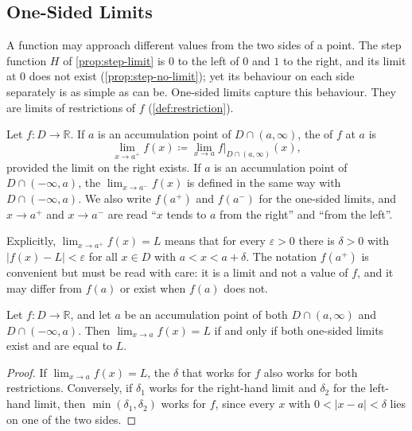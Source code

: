\subsection{One-Sided Limits}

A function may approach different values from the two sides of a point. The step function $H$ of \cref{prop:step-limit} is $0$ to the left of $0$ and $1$ to the right, and its limit at $0$ does not exist (\cref{prop:step-no-limit}); yet its behaviour on each side separately is as simple as can be. One-sided limits capture this behaviour. They are limits of restrictions of $f$ (\cref{def:restriction}).

\begin{definition}
\label{def:one-sided}
Let $f\colon D\to\mathbb R$. If $a$ is an accumulation point of $D\cap(a,\infty)$, the  of $f$ at $a$ is
\[
\lim_{x\to a^+}f(x)\coloneqq\lim_{x\to a}f|_{D\cap(a,\infty)}(x),
\]
provided the limit on the right exists. If $a$ is an accumulation point of $D\cap(-\infty,a)$, the  $\lim_{x\to a^-}f(x)$ is defined in the same way with $D\cap(-\infty,a)$. We also write $f(a^+)$ and $f(a^-)$ for the one-sided limits, and $x\to a^+$ and $x\to a^-$ are read ``$x$ tends to $a$ from the right'' and ``from the left''.
\end{definition}

Explicitly, $\lim_{x\to a^+}f(x)=L$ means that for every $\varepsilon>0$ there is $\delta>0$ with $|f(x)-L|<\varepsilon$ for all $x\in D$ with $a<x<a+\delta$. The notation $f(a^+)$ is convenient but must be read with care: it is a limit and not a value of $f$, and it may differ from $f(a)$ or exist when $f(a)$ does not.

\begin{proposition}
\label{prop:one-sided-limits}
Let $f\colon D\to\mathbb R$, and let $a$ be an accumulation point of both $D\cap(a,\infty)$ and $D\cap(-\infty,a)$. Then $\lim_{x\to a}f(x)=L$ if and only if both one-sided limits exist and are equal to $L$.
\end{proposition}

\begin{proof}
If $\lim_{x\to a}f(x)=L$, the $\delta$ that works for $f$ also works for both restrictions. Conversely, if $\delta_1$ works for the right-hand limit and $\delta_2$ for the left-hand limit, then $\min(\delta_1,\delta_2)$ works for $f$, since every $x$ with $0<|x-a|<\delta$ lies on one of the two sides.
\end{proof}

